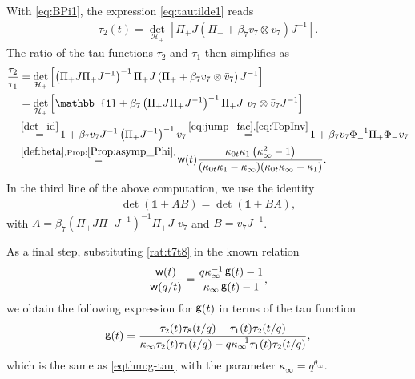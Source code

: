\documentclass[a4paper,reqno,11pt]{amsart}
\newcommand{\myrmk}[2]{\begin{quote}\fbox{\begin{minipage}{\linewidth}\small \noindent{\color{red}\bf #2:} #1{\color{red}}\end{minipage}}\end{quote}}
\newcommand{\rmkH}[1]{\myrmk{#1}{HD}}
\numberwithin{equation}{section}
\numberwithin{figure}{section}
\theoremstyle{plain}
\theoremstyle{remark}
\DeclareMathOperator{\sfg}{{\sf g}}
\DeclareMathOperator{\sfw}{{\sf w}}
\numberwithin{rhp}{section}
\begin{document}
With \eqref{eq:BPi1}, the expression \eqref{eq:tautilde1} reads
\begin{align}
    \tau_2(t) = \det_{\mathcal{H}_{+}}\left[ \Pi_{+} J \left(\Pi_{+} + \beta_7 v_7 \otimes \bar{v}_7 \right)  J^{-1}\right].
\end{align}
The ratio of the tau functions $\tau_2$ and $\tau_1$ then simplifies as
\begin{align}
  \frac{\tau_2}{\tau_1}&= \det_{\mathcal{H}_{+}} \left[\left( \Pi_{+} J \Pi_{+} J^{-1}\right)^{-1}\Pi_{+} J \left(\Pi_{+} + \beta_7 v_7 \otimes \bar{v}_7 \right)  J^{-1}  \right]\\
    &=\det_{\mathcal{H}_{+}} \left[ \mathbb{1} + \beta_7 \left( \Pi_{+} J \Pi_{+} J^{-1}\right)^{-1} \Pi_{+} J\,\, v_7 \otimes \bar{v}_7  J^{-1}  \right]\\
    &\mathop{=}^{\eqref{det_id}}1 + \beta_7 \bar{v}_7  J^{-1}  \left( \Pi_{+} J^{-1}\right)^{-1} v_7 \mathop{=}^{\eqref{eq:jump_fac},\eqref{eq:TopInv}} 1 + \beta_7  \bar{v}_7 \Phi_{-}^{-1} \Pi_{+} \Phi_{-}v_7 \\
    &\mathop{=}^{\eqref{def:beta},\text{Prop}:\ref{Prop:asymp_Phi},} \sfw(t) \frac{\kappa_{0t} \kappa_{1} \left(\kappa_{\infty}^2-1\right) }{(\kappa_{0t} \kappa_{1}-\kappa_{\infty}) (\kappa_{0t} \kappa_{\infty}-\kappa_{1})}.\label{rat:t7t8}
\end{align}
In the third line of the above computation, we use the identity 
\begin{align}\label{det_id}
    \det(\mathbb{1}+ AB) =   \det(\mathbb{1} + B A),
\end{align}
with $A = \beta_7 \left(\Pi_{+} J \Pi_{+} J^{-1}\right)^{-1} \Pi_{+} J\,\, v_7$ and $B = \bar{v}_7  J^{-1}$.

As a final step, substituting \eqref{rat:t7t8} in the known relation
\begin{align}
    \frac{\sfw(t)}{\sfw(q/t)} = \frac{q \kappa_{\infty}^{-1} \sfg(t) -1}{\kappa_{\infty} \sfg(t)-1},
\end{align}
we obtain the following expression for $\sfg(t)$ in terms of the tau function
\begin{align}
    \sfg(t) = \frac{\tau_2(t) \tau_{8}(t/q) - \tau_1(t) \tau_2(t/q)}{\kappa_{\infty} \tau_2(t) \tau_1(t/q) - q \kappa_{\infty}^{-1} \tau_1(t) \tau_2(t/q)},
\end{align}
which is the same as \eqref{eqthm:g-tau} with the parameter $\kappa_{\infty} = q^{\theta_{\infty}}$. 
\end{document}
